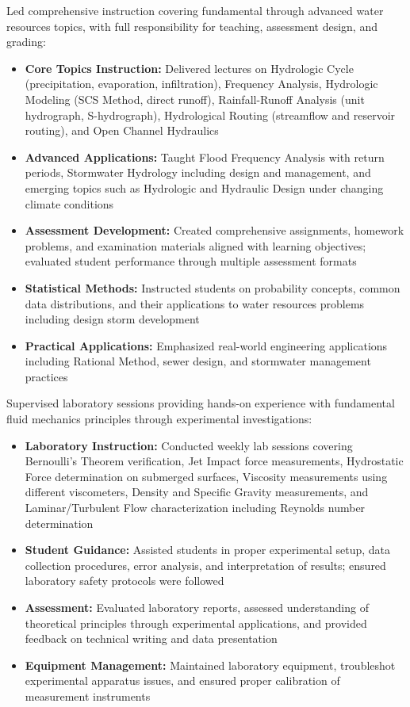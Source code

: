 \documentclass[11pt,a4paper,sans]{moderncv}
\begin{document}
{Led comprehensive instruction covering fundamental through advanced water resources topics, with full responsibility for teaching, assessment design, and grading:
\begin{itemize}
\item \textbf{Core Topics Instruction:} Delivered lectures on Hydrologic Cycle (precipitation, evaporation, infiltration), Frequency Analysis, Hydrologic Modeling (SCS Method, direct runoff), Rainfall-Runoff Analysis (unit hydrograph, S-hydrograph), Hydrological Routing (streamflow and reservoir routing), and Open Channel Hydraulics
\item \textbf{Advanced Applications:} Taught Flood Frequency Analysis with return periods, Stormwater Hydrology including design and management, and emerging topics such as Hydrologic and Hydraulic Design under changing climate conditions
\item \textbf{Assessment Development:} Created comprehensive assignments, homework problems, and examination materials aligned with learning objectives; evaluated student performance through multiple assessment formats
\item \textbf{Statistical Methods:} Instructed students on probability concepts, common data distributions, and their applications to water resources problems including design storm development
\item \textbf{Practical Applications:} Emphasized real-world engineering applications including Rational Method, sewer design, and stormwater management practices
\end{itemize}}

{Supervised laboratory sessions providing hands-on experience with fundamental fluid mechanics principles through experimental investigations:
\begin{itemize}
\item \textbf{Laboratory Instruction:} Conducted weekly lab sessions covering Bernoulli's Theorem verification, Jet Impact force measurements, Hydrostatic Force determination on submerged surfaces, Viscosity measurements using different viscometers, Density and Specific Gravity measurements, and Laminar/Turbulent Flow characterization including Reynolds number determination
\item \textbf{Student Guidance:} Assisted students in proper experimental setup, data collection procedures, error analysis, and interpretation of results; ensured laboratory safety protocols were followed
\item \textbf{Assessment:} Evaluated laboratory reports, assessed understanding of theoretical principles through experimental applications, and provided feedback on technical writing and data presentation
\item \textbf{Equipment Management:} Maintained laboratory equipment, troubleshot experimental apparatus issues, and ensured proper calibration of measurement instruments
\end{itemize}}
\end{document}
